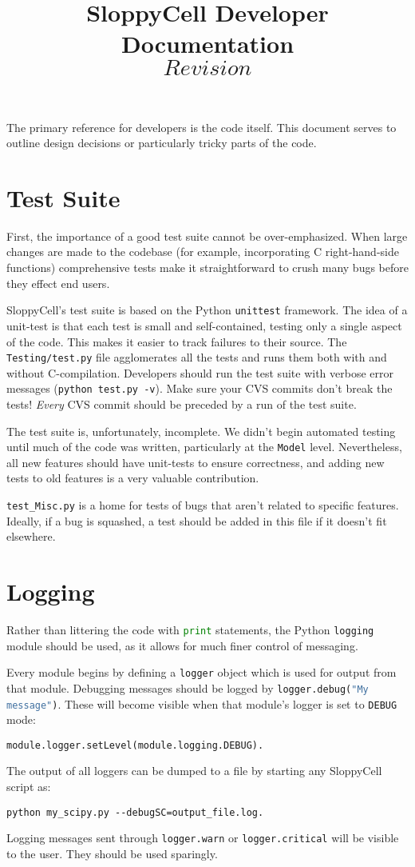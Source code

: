 \documentclass[12pt]{article}
\makeatletter
\newcommand{\py}[1]{\lstinline[language=Python, showstringspaces=False]@#1@}
\newcommand{\shell}[1]{\lstinline[language=csh, showstringspaces=False]!#1!}
\makeatother
\begin{document}
\title{SloppyCell Developer Documentation\\
\large$Revision$}
\maketitle
\tableofcontents
\clearpage

The primary reference for developers is the code itself.
This document serves to outline design decisions or particularly tricky parts of the code.

\section{Test Suite}
First, the importance of a good test suite cannot be over-emphasized.
When large changes are made to the codebase (for example, incorporating C right-hand-side functions) comprehensive tests make it straightforward to crush many bugs before they effect end users.

SloppyCell's test suite is based on the Python \py{unittest} framework.
The idea of a unit-test is that each test is small and self-contained, testing only a single aspect of the code.
This makes it easier to track failures to their source.
The \shell{Testing/test.py} file agglomerates all the tests and runs them both with and without C-compilation.
Developers should run the test suite with verbose error messages (\shell{python test.py -v}).
Make sure your CVS commits don't break the tests!
\emph{Every} CVS commit should be preceded by a run of the test suite.

The test suite is, unfortunately, incomplete.
We didn't begin automated testing until much of the code was written, particularly at the \py{Model} level.
Nevertheless, all new features should have unit-tests to ensure correctness, and adding
new tests to old features is a very valuable contribution.

\py{test_Misc.py} is a home for tests of bugs that aren't related to specific features. Ideally, if a bug is squashed, a test should be added in this file if it doesn't fit elsewhere.

\section{Logging}
Rather than littering the code with \py{print} statements, the Python \py{logging} module should be used, as it allows for much finer control of messaging.

Every module begins by defining a \py{logger} object which is used for output from that module.
Debugging messages should be logged by \py{logger.debug("My message")}.
These will become visible when that module's logger is set to \py{DEBUG} mode:
\begin{lstlisting}
module.logger.setLevel(module.logging.DEBUG).
\end{lstlisting}
The output of all loggers can be dumped to a file by starting any SloppyCell script as:
\begin{lstlisting}
python my_scipy.py --debugSC=output_file.log.
\end{lstlisting}
Logging messages sent through \py{logger.warn} or \py{logger.critical} will be visible to the user. They should be used sparingly.
\end{document}
